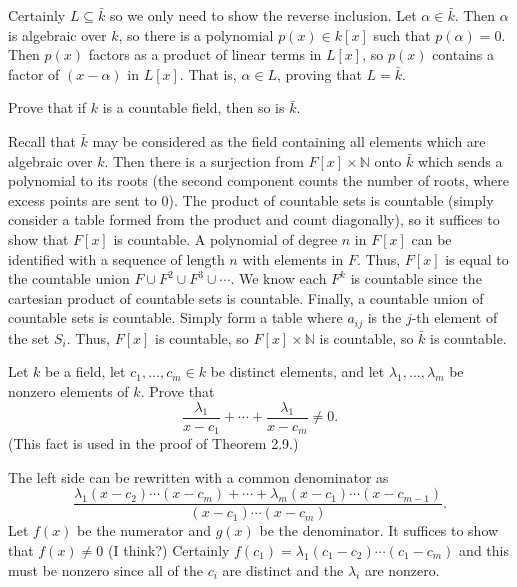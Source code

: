 \documentclass[../../master.tex]{subfiles}
\begin{document}
\begin{solution}
    Certainly $L \subseteq \bar{k}$ so we only need to show the reverse inclusion.
    Let $\alpha \in \bar{k}$.
    Then $\alpha$ is algebraic over $k$, so there is a polynomial $p(x) \in k[x]$ such that $p(\alpha) = 0$.
    Then $p(x)$ factors as a product of linear terms in $L[x]$, so $p(x)$ contains a factor of $(x - \alpha)$ in $L[x]$.
    That is, $\alpha \in L$, proving that $L = \bar{k}$.
\end{solution}

\begin{problem}
    Prove that if $k$ is a countable field, then so is $\bar{k}$.
\end{problem}

\begin{solution}
    Recall that $\bar{k}$ may be considered as the field containing all elements which are algebraic over $k$.
    Then there is a surjection from $F[x] \times \mathbb{N}$ onto $\bar{k}$ which sends a polynomial to its roots (the second component counts the number of roots, where excess points are sent to 0).
    The product of countable sets is countable (simply consider a table formed from the product and count diagonally), so it suffices to show that $F[x]$ is countable.
    A polynomial of degree $n$ in $F[x]$ can be identified with a sequence of length $n$ with elements in $F$.
    Thus, $F[x]$ is equal to the countable union $F \cup F^2 \cup F^3 \cup \cdots$.
    We know each $F^{k}$ is countable since the cartesian product of countable sets is countable.
    Finally, a countable union of countable sets is countable.
    Simply form a table where $a_{ij}$ is the $j$-th element of the set $S_i$.
    Thus, $F[x]$ is countable, so $F[x] \times \mathbb{N}$ is countable, so $\bar{k}$ is countable.
\end{solution}

\begin{problem}
    Let $k$ be a field, let $c_1, \ldots, c_m \in k$ be distinct elements, and let $\lambda_1, \ldots, \lambda_m$ be nonzero elements of $k$.
    Prove that 
    \[
    \frac{\lambda_1}{x - c_1} + \cdots + \frac{\lambda_1}{x - c_m} \neq 0.
    \]
    (This fact is used in the proof of Theorem 2.9.)
\end{problem}

\begin{solution}
    The left side can be rewritten with a common denominator as
    \[
        \frac{\lambda_1 (x-c_2) \cdots (x-c_m) + \cdots + \lambda_m (x-c_1) \cdots (x-c_{m-1})}{(x-c_1) \cdots (x-c_m)}.
    \]
    Let $f(x)$ be the numerator and $g(x)$ be the denominator.
    It suffices to show that $f(x) \neq 0$ (I think?)
    Certainly $f(c_1) = \lambda_1(c_1 - c_2) \cdots (c_1 - c_m)$ and this must be nonzero since all of the $c_i$ are distinct and the $\lambda_i$ are nonzero.
\end{solution}
\end{document}

